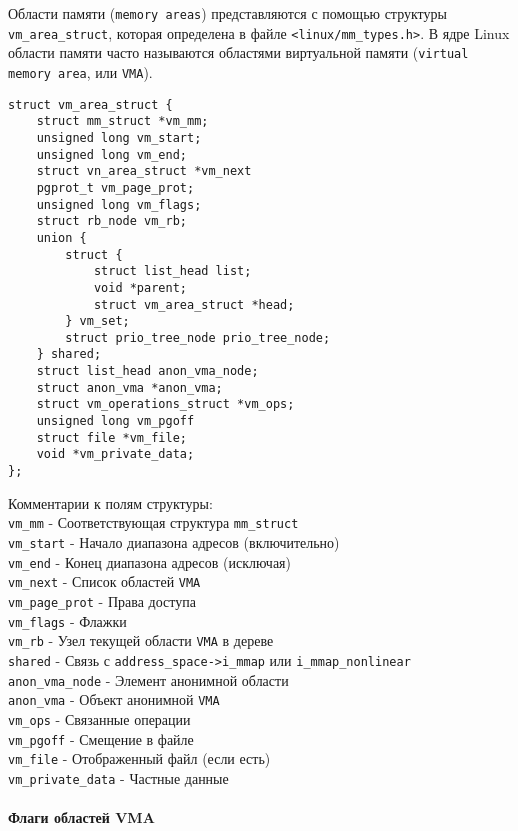 \documentclass[12pt]{article}
\begin{document}
Области памяти (\verb!memory areas!) представляются с помощью структуры \verb!vm_area_struct!, 
которая определена в файле \verb!<linux/mm_types.h>!. В ядре Linux области памяти часто называются областями виртуальной памяти
(\verb!virtual memory area!, или \verb!VMA!).

\begin{lstlisting}
struct vm_area_struct {
    struct mm_struct *vm_mm;
    unsigned long vm_start;
    unsigned long vm_end;
    struct vn_area_struct *vm_next
    pgprot_t vm_page_prot;
    unsigned long vm_flags;
    struct rb_node vm_rb;
    union {
        struct {
            struct list_head list;
            void *parent;
            struct vm_area_struct *head;
        } vm_set;
        struct prio_tree_node prio_tree_node;
    } shared;
    struct list_head anon_vma_node; 
    struct anon_vma *anon_vma;
    struct vm_operations_struct *vm_ops;
    unsigned long vm_pgoff
    struct file *vm_file;
    void *vm_private_data;
};
\end{lstlisting}

Комментарии к полям структуры: \\
\verb!vm_mm! - Соответствующая структура \verb!mm_struct!\\
\verb!vm_start! - Начало диапазона адресов (включительно)\\
\verb!vm_end! - Конец диапазона адресов (исключая)\\
\verb!vm_next! - Список областей \verb!VMA!\\
\verb!vm_page_prot! - Права доступа\\
\verb!vm_flags! - Флажки\\
\verb!vm_rb! - Узел текущей области \verb!VMA! в дереве\\
\verb!shared! - Связь с \verb!address_space->i_mmap! или \verb!i_mmap_nonlinear!\\
\verb!anon_vma_node! - Элемент анонимной области\\
\verb!anon_vma! - Объект анонимной \verb!VMA!\\
\verb!vm_ops! - Связанные операции\\
\verb!vm_pgoff! - Смещение в файле\\
\verb!vm_file! - Отображенный файл (если есть)\\
\verb!vm_private_data! - Частные данные

\paragraph*{Флаги областей VMA}
~\\
\end{document}
